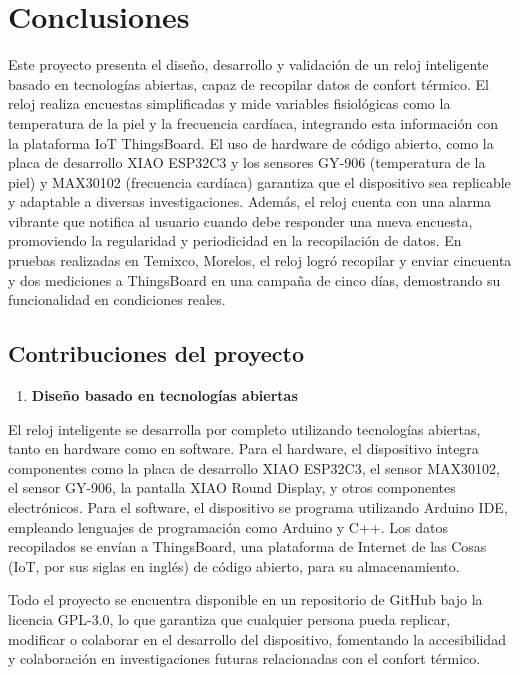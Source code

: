\documentclass[
  12pt,
  letterpaper,
  DIV=11,
  numbers=noendperiod]{scrreport}
\providecommand{\tightlist}{%
  \setlength{\itemsep}{0pt}\setlength{\parskip}{0pt}}\usepackage{longtable,booktabs,array}
\begin{document}
\hypertarget{conclusiones}{%
\chapter{Conclusiones}\label{conclusiones}}

Este proyecto presenta el diseño, desarrollo y validación de un reloj
inteligente basado en tecnologías abiertas, capaz de recopilar datos de
confort térmico. El reloj realiza encuestas simplificadas y mide
variables fisiológicas como la temperatura de la piel y la frecuencia
cardíaca, integrando esta información con la plataforma IoT ThingsBoard.
El uso de hardware de código abierto, como la placa de desarrollo XIAO
ESP32C3 y los sensores GY-906 (temperatura de la piel) y MAX30102
(frecuencia cardíaca) garantiza que el dispositivo sea replicable y
adaptable a diversas investigaciones. Además, el reloj cuenta con una
alarma vibrante que notifica al usuario cuando debe responder una nueva
encuesta, promoviendo la regularidad y periodicidad en la recopilación
de datos. En pruebas realizadas en Temixco, Morelos, el reloj logró
recopilar y enviar cincuenta y dos mediciones a ThingsBoard en una
campaña de cinco días, demostrando su funcionalidad en condiciones
reales.

\hypertarget{contribuciones-del-proyecto}{%
\section{Contribuciones del
proyecto}\label{contribuciones-del-proyecto}}

\begin{enumerate}
\def\labelenumi{\arabic{enumi}.}
\tightlist
\item
  \textbf{Diseño basado en tecnologías abiertas}
\end{enumerate}

El reloj inteligente se desarrolla por completo utilizando tecnologías
abiertas, tanto en hardware como en software. Para el hardware, el
dispositivo integra componentes como la placa de desarrollo XIAO
ESP32C3, el sensor MAX30102, el sensor GY-906, la pantalla XIAO Round
Display, y otros componentes electrónicos. Para el software, el
dispositivo se programa utilizando Arduino IDE, empleando lenguajes de
programación como Arduino y C++. Los datos recopilados se envían a
ThingsBoard, una plataforma de Internet de las Cosas (IoT, por sus
siglas en inglés) de código abierto, para su almacenamiento.

Todo el proyecto se encuentra disponible en un repositorio de GitHub
bajo la licencia GPL-3.0, lo que garantiza que cualquier persona pueda
replicar, modificar o colaborar en el desarrollo del dispositivo,
fomentando la accesibilidad y colaboración en investigaciones futuras
relacionadas con el confort térmico.
\end{document}
